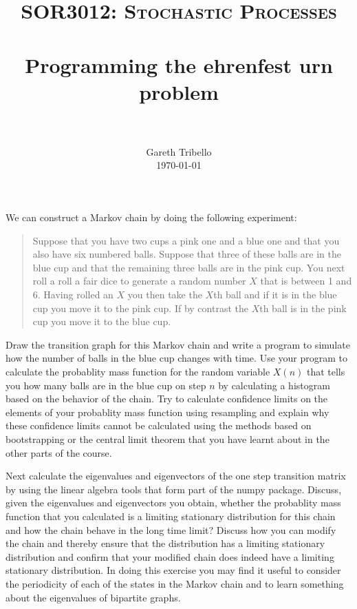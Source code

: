 \documentclass[paper=a4, fontsize=11pt]{scrartcl}
\title{\usefont{OT1}{bch}{b}{n} \normalfont \normalsize \textsc{SOR3012:
Stochastic Processes} \\ [25pt] \horrule{0.5pt} \\[0.4cm] 
\huge Programming the ehrenfest urn problem \\
\horrule{2pt} \\[0.25cm]
}
\author{ \normalfont
\normalsize
        Gareth Tribello \\[-3pt] \normalsize
        \today
}
\date{}
\numberwithin{equation}{section}
\numberwithin{figure}{section}
\numberwithin{table}{section}
\begin{document}
\maketitle

We can construct a Markov chain by doing the following experiment:

\begin{quotation}
Suppose that you have two cups a pink one and a blue one and that you also have six numbered balls.  Suppose that three of these balls are in the blue cup and that
the remaining three balls are in the pink cup.  You next roll a roll a fair dice to generate a random number $X$ that is between 1 and 6.  Having rolled an $X$ you then
take the $X$th ball and if it is in the blue cup you move it to the pink cup.  If by contrast the $X$th ball is in the pink cup you move it to the blue cup.
\end{quotation}

Draw the transition graph for this Markov chain and write a program to simulate how the number of balls in the blue cup changes with time.  Use your program to calculate
the probablity mass function for the random variable $X(n)$ that tells you how many balls are in the blue cup on step $n$ by calculating a histogram based on the behavior 
of the chain.  Try to calculate confidence limits on the elements of your probablity mass function using resampling and explain why these confidence limits cannot be calculated 
using the methods based on bootstrapping or the central limit theorem that you have learnt about in the other parts of the course. 

Next calculate the eigenvalues and eigenvectors of the one step transition matrix by using the linear algebra tools that form part of the numpy package.  
Discuss, given the eigenvalues and eigenvectors you obtain, whether the probablity mass function that you calculated is a limiting stationary distribution for this chain and how 
the chain behave in the long time limit?  Discuss how you can modify the chain and thereby ensure that the distribution has a limiting stationary distribution and confirm that your
modified chain does indeed have a limiting stationary distribution.  In doing this exercise you may find it useful to consider the periodicity of each of the states in the 
Markov chain and to learn something about the eigenvalues of bipartite graphs.
\end{document}
